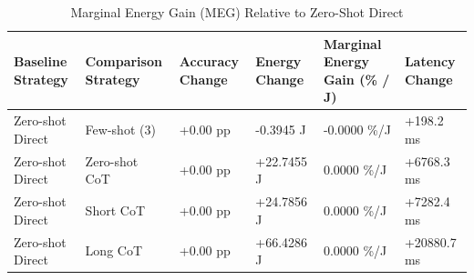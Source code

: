 \begin{table}
\caption{Marginal Energy Gain (MEG) Relative to Zero-Shot Direct}
\label{tab:marginal_energy_gain}
\begin{tabular}{llllll}
\toprule
Baseline Strategy & Comparison Strategy & Accuracy Change & Energy Change & Marginal Energy Gain (\% / J) & Latency Change \\
\midrule
Zero-shot Direct & Few-shot (3) & +0.00 pp & -0.3945 J & -0.0000 \%/J & +198.2 ms \\
Zero-shot Direct & Zero-shot CoT & +0.00 pp & +22.7455 J & 0.0000 \%/J & +6768.3 ms \\
Zero-shot Direct & Short CoT & +0.00 pp & +24.7856 J & 0.0000 \%/J & +7282.4 ms \\
Zero-shot Direct & Long CoT & +0.00 pp & +66.4286 J & 0.0000 \%/J & +20880.7 ms \\
\bottomrule
\end{tabular}
\end{table}
